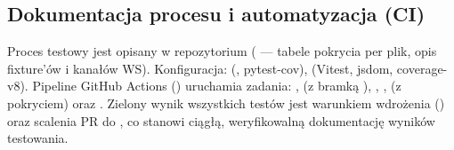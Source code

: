 \subsection{Dokumentacja procesu i automatyzacja (CI)}
Proces testowy jest opisany w repozytorium ( — tabele
pokrycia per plik, opis fixture'ów i kanałów WS). Konfiguracja: 
(, pytest-cov),  (Vitest, jsdom,
coverage-v8). Pipeline GitHub Actions () uruchamia
zadania: ,  (z bramką ),
, ,  (z pokryciem) oraz
. Zielony wynik wszystkich testów jest warunkiem wdrożenia
() oraz scalenia PR do , co stanowi ciągłą, weryfikowalną
dokumentację wyników testowania.
